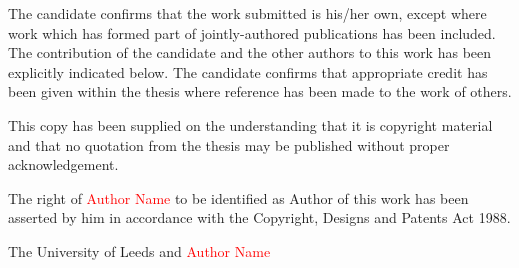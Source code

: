 \justify
\begin{normalsize}
	\noindent
	The candidate confirms that the work submitted is his/her own, except where work which has formed part of jointly-authored publications has been included. The contribution of the candidate and the other authors to this work has been explicitly indicated below. The candidate confirms that appropriate credit has been given within the thesis where reference has been made to the work of others. \bigskip 
	
	\noindent
	This copy has been supplied on the understanding that it is copyright material and that no quotation from the thesis may be published without proper acknowledgement. \bigskip
	
	\noindent
	The right of \textcolor{red}{Author Name} to be identified as Author of this work has been asserted by him in accordance with the Copyright, Designs and Patents Act 1988.
	
	\vfill
	
	\textcopyright{} The University of Leeds and \textcolor{red}{Author Name}
\end{normalsize} 
